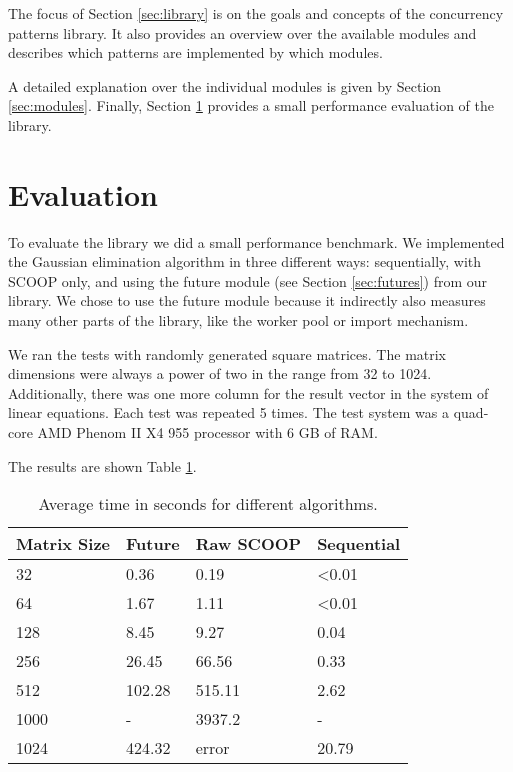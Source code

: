 \documentclass[a4paper,10pt,titlepage]{article}
\begin{document}
The focus of Section \ref{sec:library} is on the goals and concepts of the concurrency patterns library.
It also provides an overview over the available modules and describes which patterns are implemented by which modules.

A detailed explanation over the individual modules is given by Section \ref{sec:modules}.
Finally, Section \ref{sec:evaluation} provides a small performance evaluation of the library.






\section{Evaluation}
\label {sec:evaluation}

To evaluate the library we did a small performance benchmark.
We implemented the Gaussian elimination algorithm in three different ways: sequentially, with SCOOP only, and using the future module (see Section \ref{sec:futures}) from our library.
We chose to use the future module because it indirectly also measures many other parts of the library, like the worker pool or import mechanism.

We ran the tests with randomly generated square matrices.
The matrix dimensions were always a power of two in the range from 32 to 1024.
Additionally, there was one more column for the result vector in the system of linear equations.
Each test was repeated 5 times.
The test system was a quad-core AMD Phenom II X4 955 processor with 6 GB of RAM.

The results are shown Table \ref{table:perf-results}.

\begin{table} [h]
\centering
\begin{tabular}{|l|l l l|} 
\hline
Matrix Size & Future & Raw SCOOP & Sequential\\
\hline
32 & 0.36 & 0.19 &  \textless 0.01\\
64 & 1.67 & 1.11 & \textless 0.01\\
128 & 8.45 & 9.27 & 0.04\\
256 & 26.45 & 66.56 & 0.33\\
512 & 102.28 & 515.11 & 2.62\\
1000 & - &  3937.2 & - \\
1024 & 424.32 & error & 20.79 \\
\hline
\end{tabular}
\caption{Average time in seconds for different algorithms.}
\label{table:perf-results}
\end{table}
\end{document}
